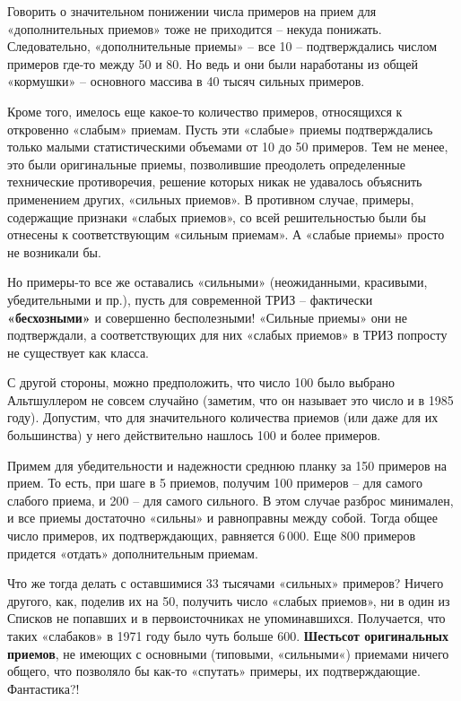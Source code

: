 \documentclass[11pt,a4paper]{article}
\begin{document}
Говорить о значительном понижении числа примеров на прием для «дополнительных
приемов» тоже не приходится -- некуда понижать. Следовательно, «дополнительные
приемы» -- все 10 -- подтверждались числом примеров где-то между 50 и 80. Но
ведь и они были наработаны из общей «кормушки» -- основного массива в 40 тысяч
сильных примеров.

Кроме того, имелось еще какое-то количество примеров, относящихся к откровенно
«слабым» приемам. Пусть эти «слабые» приемы подтверждались только малыми
статистическими объемами от 10 до 50 примеров. Тем не менее, это были
оригинальные приемы, позволившие преодолеть определенные технические
противоречия, решение которых никак не удавалось объяснить применением других,
«сильных приемов». В противном случае, примеры, содержащие признаки «слабых
приемов», со всей решительностью были бы отнесены к соответствующим «сильным
приемам». А «слабые приемы» просто не возникали бы.

Но примеры-то все же оставались «сильными» (неожиданными, красивыми,
убедительными и пр.), пусть для современной ТРИЗ -- фактически
\textbf{«бесхозными»} и совершенно бесполезными! «Сильные приемы» они не
подтверждали, а соответствующих для них «слабых приемов» в ТРИЗ попросту не
существует как класса.

С другой стороны, можно предположить, что число 100 было выбрано Альтшуллером
не совсем случайно (заметим, что он называет это число и в 1985 году).
Допустим, что для значительного количества приемов (или даже для их
большинства) у него действительно нашлось 100 и более примеров.

Примем для убедительности и надежности среднюю планку за 150 примеров на
прием. То есть, при шаге в 5 приемов, получим 100 примеров -- для самого
слабого приема, и 200 -- для самого сильного. В этом случае разброс минимален,
и все приемы достаточно «сильны» и равноправны между собой. Тогда общее число
примеров, их подтверждающих, равняется 6\,000. Еще 800 примеров придется
«отдать» дополнительным приемам.

Что же тогда делать с оставшимися 33 тысячами «сильных» примеров? Ничего
другого, как, поделив их на 50, получить число «слабых приемов», ни в один из
Списков не попавших и в первоисточниках не упоминавшихся. Получается, что
таких «слабаков» в 1971 году было чуть больше 600. \textbf{Шестьсот
  оригинальных приемов}, не имеющих с основными (типовыми, «сильными«)
приемами ничего общего, что позволяло бы как-то «спутать» примеры, их
подтверждающие. Фантастика?!
\end{document}

